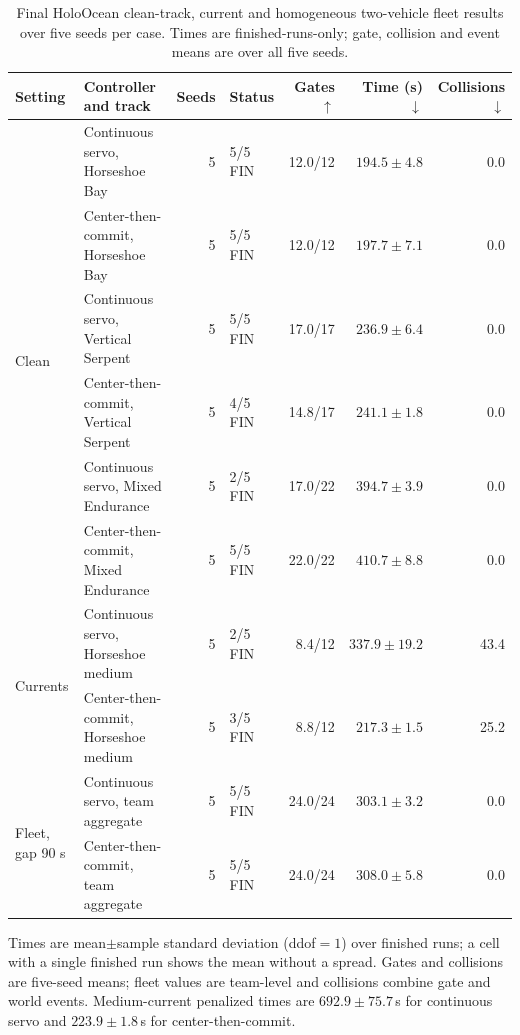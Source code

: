 \begin{table}[t]
\centering
\caption{Final HoloOcean clean-track, current and homogeneous two-vehicle fleet results over five seeds per case. Times are finished-runs-only; gate, collision and event means are over all five seeds.}
\label{tab:validation_results}
\mratablestyle
\begin{tabular}{llrlrrr}
\toprule
Setting & Controller and track & Seeds & Status & Gates $\uparrow$ & Time (s) $\downarrow$ & Collisions $\downarrow$ \\
\midrule
\multirow{6}{*}{Clean}
 & Continuous servo, Horseshoe Bay & 5 & 5/5 FIN & 12.0/12 & $194.5\pm4.8$ & 0.0 \\
 & Center-then-commit, Horseshoe Bay & 5 & 5/5 FIN & 12.0/12 & $197.7\pm7.1$ & 0.0 \\
 & Continuous servo, Vertical Serpent & 5 & 5/5 FIN & 17.0/17 & $236.9\pm6.4$ & 0.0 \\
 & Center-then-commit, Vertical Serpent & 5 & 4/5 FIN & 14.8/17 & $241.1\pm1.8$ & 0.0 \\
 & Continuous servo, Mixed Endurance & 5 & 2/5 FIN & 17.0/22 & $394.7\pm3.9$ & 0.0 \\
 & Center-then-commit, Mixed Endurance & 5 & 5/5 FIN & 22.0/22 & $410.7\pm8.8$ & 0.0 \\
\midrule
\multirow{2}{*}{Currents}
 & Continuous servo, Horseshoe medium & 5 & 2/5 FIN & 8.4/12 & $337.9\pm19.2$ & 43.4 \\
 & Center-then-commit, Horseshoe medium & 5 & 3/5 FIN & 8.8/12 & $217.3\pm1.5$ & 25.2 \\
\midrule
\multirow{2}{*}{Fleet, gap 90 s}
 & Continuous servo, team aggregate & 5 & 5/5 FIN & 24.0/24 & $303.1\pm3.2$ & 0.0 \\
 & Center-then-commit, team aggregate & 5 & 5/5 FIN & 24.0/24 & $308.0\pm5.8$ & 0.0 \\
\bottomrule
\end{tabular}
\mratablenote Times are mean$\pm$sample standard deviation (ddof$=1$) over finished runs; a cell with a single finished run shows the mean without a spread. Gates and collisions are five-seed means; fleet values are team-level and collisions combine gate and world events. Medium-current penalized times are $692.9\pm75.7$\,s for continuous servo and $223.9\pm1.8$\,s for center-then-commit.
\end{table}
